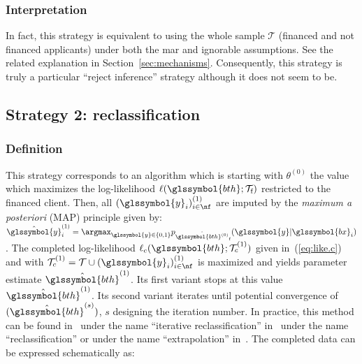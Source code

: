 \subsubsection{Interpretation}
In fact, this strategy is equivalent to using the whole sample $\mathcal{T}$ (financed and not financed applicants) under both the \gls{mar} and ignorable assumptions. See the related explanation in Section~\ref{sec:mechanisms}. Consequently, this strategy is truly a particular ``reject inference'' strategy although it does not seem to be.

\subsection{Strategy 2: reclassification}

\subsubsection{Definition}
This strategy corresponds to an algorithm which is starting with $\theta^{(0)}$ the value which maximizes the log-likelihood $\ell(\glssymbol{bth};\mathcal{T}_{\text{f}})$ restricted to the financed client. Then, all $(\glssymbol{y}_i)^{(1)}_{i \in \nf}$ are imputed by the {\it maximum a posteriori} (MAP) principle given by: $\hat{\glssymbol{y}}^{(1)}_i = \argmax_{\glssymbol{y} \in \{0,1\}} p_{\hat{\glssymbol{bth}^{(0)}}_{\text{f}}}(\glssymbol{y} | \glssymbol{bx}_i)$. The completed log-likelihood $\ell_c(\glssymbol{bth};\mathcal{T}_c^{(1)})$ given in~(\ref{eq:like.c}) and with $\mathcal{T}_c^{(1)}=\mathcal{T} \cup (\glssymbol{y}_i)^{(1)}_{i \in \nf}$ is maximized and yields parameter estimate $\hat{\glssymbol{bth}}^{(1)}$. Its first variant stops at this value $\hat{\glssymbol{bth}}^{(1)}$. Its second variant iterates until potential convergence of $(\hat{\glssymbol{bth}}^{(s)})$, $s$ designing the iteration number. In practice, this method can be found in~\cite{saporta} under the name ``iterative reclassification'' in~\cite{RI6}  under the name ``reclassification'' or under the name ``extrapolation'' in~\cite{banasik}. The completed data can be expressed schematically as:


